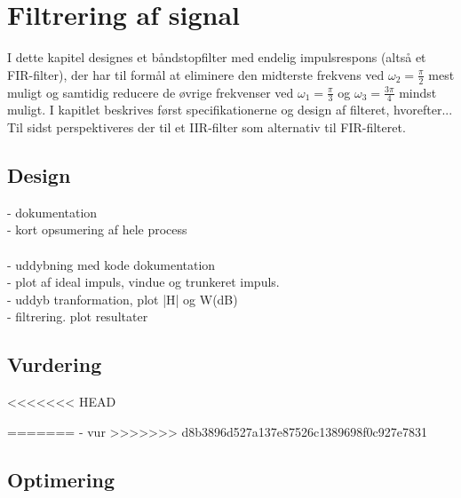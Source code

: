 \chapter{Filtrering af signal}
I dette kapitel designes et båndstopfilter med endelig impulsrespons (altså et FIR-filter), der har til formål at eliminere den midterste frekvens ved $\omega_2 = \frac{\pi}{2}$ mest muligt og samtidig reducere de øvrige frekvenser ved $\omega_1 = \frac{\pi}{3}$ og $\omega_3 = \frac{3\pi}{4}$ mindst muligt. I kapitlet beskrives først specifikationerne og design af filteret, hvorefter... Til sidst perspektiveres der til et IIR-filter som alternativ til FIR-filteret.


\section{Design}
- dokumentation\\
- kort opsumering af hele process\\ 
\\
- uddybning med kode dokumentation\\
- plot af ideal impuls, vindue og trunkeret impuls.\\ 
- uddyb tranformation, plot |H| og W(dB)\\
- filtrering. plot resultater \\



\section{Vurdering}
<<<<<<< HEAD

=======
- vur   
>>>>>>> d8b3896d527a137e87526c1389698f0c927e7831

\section{Optimering}

